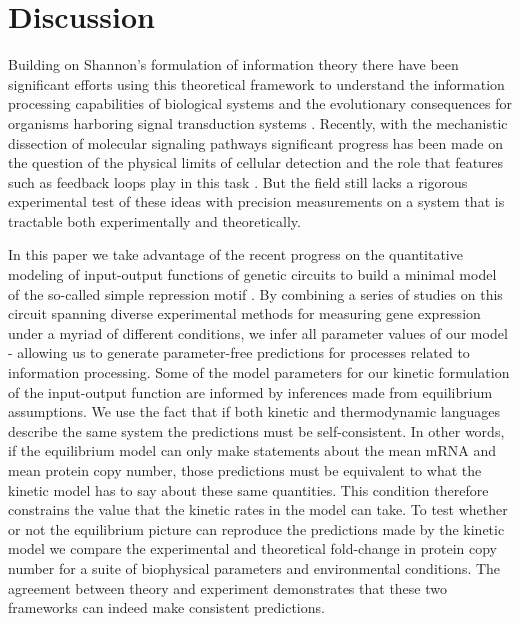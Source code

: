 \section*{Discussion}

Building on Shannon's formulation of information theory there have been
significant efforts using this theoretical framework to understand the
information processing capabilities of biological systems and the evolutionary
consequences for organisms harboring signal transduction systems
\cite{Bergstrom2004, Taylor2007a, Tkacik2008, Polani2009, Nemenman2010,
Rivoire2011}. Recently, with the mechanistic dissection of molecular signaling
pathways significant progress has been made on the question of the physical
limits of cellular detection and the role that features such as feedback loops
play in this task \cite{Bialek2005, Libby2007, Tkacik2011, Rhee2012a,
Voliotis2014a}. But the field still lacks a rigorous experimental test of these
ideas with precision measurements on a system that is tractable both
experimentally and theoretically.

In this paper we take advantage of the recent progress on the quantitative
modeling of input-output functions of genetic circuits to build a minimal model
of the so-called simple repression motif . By combining a
series of studies on this circuit spanning diverse experimental methods for
measuring gene expression under a myriad of different conditions, we infer all
parameter values of our model - allowing us to generate parameter-free
predictions for processes related to information processing. Some of the model
parameters for our kinetic formulation of the input-output function are informed
by inferences made from equilibrium assumptions. We use the fact that if both
kinetic and thermodynamic languages describe the same system the predictions
must be self-consistent. In other words, if the equilibrium model can only make
statements about the mean mRNA and mean protein copy number, those predictions
must be equivalent to what the kinetic model has to say about these same
quantities. This condition therefore constrains the value that the kinetic rates
in the model can take. To test whether or not the equilibrium picture can
reproduce the predictions made by the kinetic model we compare the experimental
and theoretical fold-change in protein copy number for a suite of biophysical
parameters and environmental conditions. The agreement between theory and
experiment demonstrates that these two frameworks can indeed make consistent
predictions.

